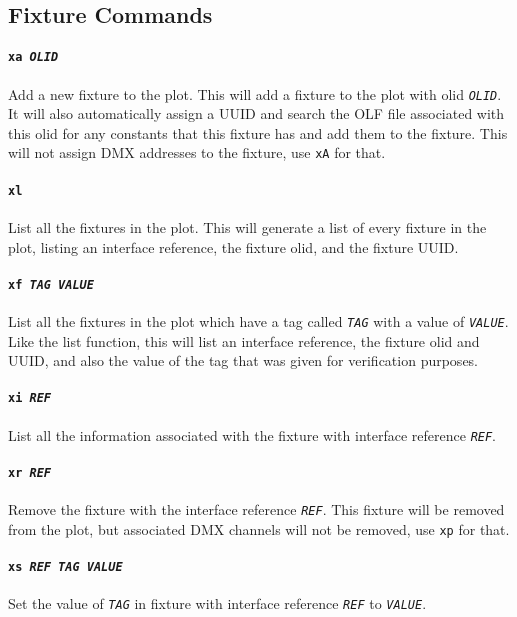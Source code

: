 \documentclass[a4paper]{article}
\begin{document}
\subsection{Fixture Commands}

\paragraph{\texttt{xa \textit{OLID}}}
Add a new fixture to the plot. This will add a fixture to the plot with olid 
\texttt{\textit{OLID}}. It will also automatically assign a UUID and search 
the OLF file associated with this olid for any constants that this fixture has and add them to the fixture. This will not assign DMX addresses to the fixture,
use \texttt{xA} for that.

\paragraph{\texttt{xl}}
List all the fixtures in the plot. This will generate a list of every fixture 
in the plot, listing an interface reference, the fixture olid, and the fixture 
UUID.

\paragraph{\texttt{xf \textit{TAG VALUE}}}
List all the fixtures in the plot which have a tag called \texttt{\textit{TAG}} 
with a value of \texttt{\textit{VALUE}}. Like the list function, this will list 
an interface reference, the fixture olid and UUID, and also the value of the 
tag that was given for verification purposes.

\paragraph{\texttt{xi \textit{REF}}}
List all the information associated with the fixture with interface reference 
\texttt{\textit{REF}}.

\paragraph{\texttt{xr \textit{REF}}}
Remove the fixture with the interface reference \texttt{\textit{REF}}. This 
fixture will be removed from the plot, but associated DMX channels will not be 
removed, use \texttt{xp} for that.

\paragraph{\texttt{xs \textit{REF TAG VALUE}}}
Set the value of \texttt{\textit{TAG}} in fixture with interface reference 
\texttt{\textit{REF}} to \texttt{\textit{VALUE}}.
\end{document}
